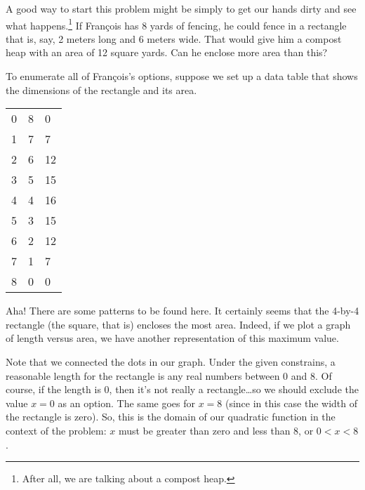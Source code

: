 A good way to start this problem might be simply to get our hands dirty and see what happens.\footnote{After all, we are talking about a compost heap.} If Fran\c{c}ois has 8 yards of fencing, he could fence in a rectangle that is, say, 2 meters long and 6 meters wide. That would give him a compost heap with an area of 12 square yards. Can he enclose more area than this?

To enumerate all of Fran\c{c}ois's options, suppose we set up a data table that shows the dimensions of the rectangle and its area.

\begin{table}
\begin{tabular}{C{2cm}C{2cm}|C{2.5cm}}
 &  & \\ & 8 & 0\\
1 & 7 & 7\\
2 & 6 & 12\\
3 & 5 & 15\\
4 & 4 & 16\\
5 & 3 & 15\\
6 & 2 & 12\\
7 & 1 & 7\\
8 & 0 & 0
\end{tabular}
\end{table}

Aha! There are some patterns to be found here. It certainly seems that the 4-by-4 rectangle (the square, that is) encloses the most area. Indeed, if we plot a graph of length versus area, we have another representation of this maximum value.

\begin{figure}
\end{figure}

Note that we connected the dots in our graph. Under the given constrains, a reasonable length for the rectangle is any real numbers between 0 and 8. Of course, if the length is 0, then it's not really a rectangle\ldots so we should exclude the value $x=0$ as an option. The same goes for $x=8$ (since in this case the width of the rectangle is zero). So, this is the domain of our quadratic function in the context of the problem: $x$ must be greater than zero and less than 8, or $0<x<8$.

